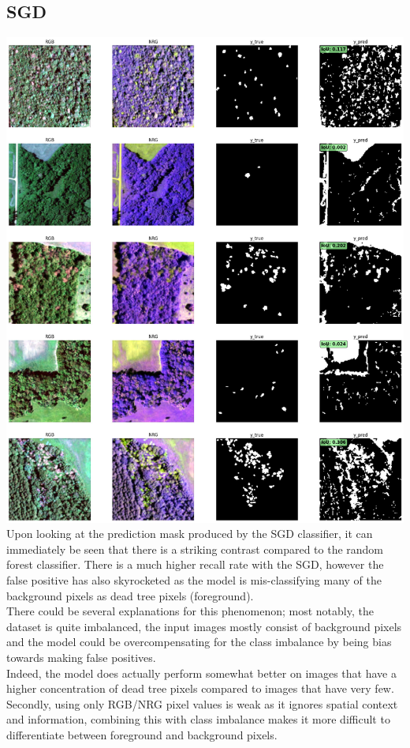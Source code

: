 \subsection{SGD}
\includegraphics[width=.95\linewidth]{figs/SGDmask.jpg}\\
Upon looking at the prediction mask produced by the SGD classifier, it can immediately be seen that there is a striking contrast compared to the random forest classifier. There is a much higher recall rate with the SGD, however the false positive has also skyrocketed as the model is mis-classifying many of the background pixels as dead tree pixels (foreground).\\
There could be several explanations for this phenomenon; most notably, the dataset is quite imbalanced, the input images mostly consist of background pixels and the model could be overcompensating for the class imbalance by being bias towards making false positives.\\
Indeed, the model does actually perform somewhat better on images that have a higher concentration of dead tree pixels compared to images that have very few. Secondly, using only RGB/NRG pixel values is weak as it ignores spatial context and information, combining this with class imbalance makes it more difficult to differentiate between foreground and background pixels.\\
